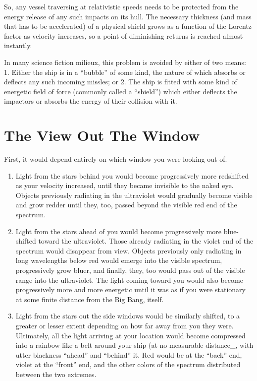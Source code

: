 \documentclass[
  letterpaper,
]{book}
\providecommand{\tightlist}{%
  \setlength{\itemsep}{0pt}\setlength{\parskip}{0pt}}
\begin{document}
So, any vessel traversing at relativistic speeds needs to be protected
from the energy release of any such impacts on its hull. The necessary
thickness (and mass that has to be accelerated) of a physical shield
grows as a function of the Lorentz factor as velocity increases, so a
point of diminishing returns is reached almost instantly.

In many science fiction milieux, this problem is avoided by either of
two means: 1. Either the ship is in a ``bubble'' of some kind, the
nature of which absorbs or deflects any such incoming missles; or 2. The
ship is fitted with some kind of energetic field of force (commonly
called a ``shield'') which either deflects the impactors or absorbs the
energy of their collision with it.

\section{The View Out The Window}\label{the-view-out-the-window}

First, it would depend entirely on which window you were looking out of.

\begin{enumerate}
\def\labelenumi{\arabic{enumi}.}
\tightlist
\item
  Light from the stars behind you would become progressively more
  redshifted as your velocity increased, until they became invisible to
  the naked eye. Objects previously radiating in the ultraviolet would
  gradually become visible and grow redder until they, too, passed
  beyond the visible red end of the spectrum.
\item
  Light from the stars ahead of you would become progressively more
  blue-shifted toward the ultraviolet. Those already radiating in the
  violet end of the spectrum would disappear from view. Objects
  previously only radiating in long wavelengths below red would emerge
  into the visible spectrum, progressively grow bluer, and finally,
  they, too would pass out of the visible range into the ultraviolet.
  The light coming toward you would also become progressively more and
  more energetic until it was as if you were stationary at some finite
  distance from the Big Bang, itself.
\item
  Light from the stars out the side windows would be similarly shifted,
  to a greater or lesser extent depending on how far away from you they
  were. Ultimately, all the light arriving at your location would become
  compressed into a rainbow like a belt around your ship (at no
  measurable distance\_, with utter blackness ``ahead'' and ``behind''
  it. Red would be at the ``back'' end, violet at the ``front'' end, and
  the other colors of the spectrum distributed between the two extremes.
\end{enumerate}
\end{document}
